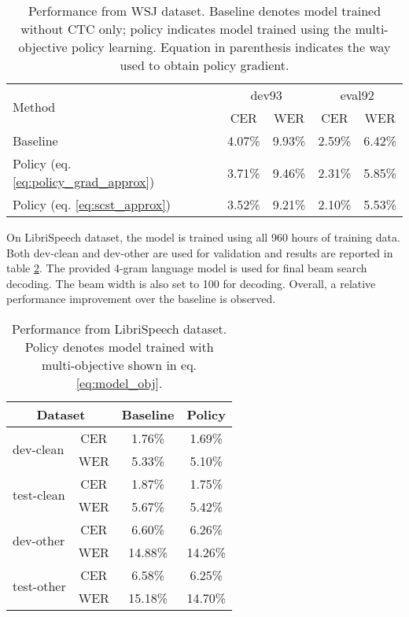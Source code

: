 \documentclass{article}
\begin{document}
\begin{table}[tbp!]
\centering
\begin{tabular}{lcccc}
\toprule
\multirow{2}{*}{Method} & \multicolumn{2}{c}{dev93} & \multicolumn{2}{c}{eval92} \\
						& CER & WER & CER & WER \\
\midrule
Baseline 								 & 4.07\% & 9.93\% & 2.59\% & 6.42\%\\
Policy (eq. \ref{eq:policy_grad_approx}) & 3.71\% & 9.46\% & 2.31\% & 5.85\%\\
Policy (eq. \ref{eq:scst_approx})  		 & 3.52\% & 9.21\% & 2.10\% & 5.53\%\\
\bottomrule
\end{tabular}
\caption{Performance from WSJ dataset. Baseline denotes model trained without CTC only; policy indicates model trained using the multi-objective policy learning. Equation in parenthesis indicates the way used to obtain policy gradient.}
\label{tbl:wsj_comp}
\end{table}


On LibriSpeech dataset, the model is trained using all 960 hours of training data. Both dev-clean and dev-other are used for validation and results are reported in table \ref{tbl:libri_comp}. The provided 4-gram language model is used for final beam search decoding. The beam width is also set to 100 for decoding. Overall, a relative  performance improvement over the baseline is observed.


\begin{table}[tbp!]
\centering
\begin{tabular}{lccc}
\toprule
\multicolumn{2}{c}{Dataset} & Baseline & Policy \\
\midrule
\multirow{2}{*}{dev-clean} 	& CER & 1.76\% 	& 1.69\%\\
							& WER & 5.33\%	& 5.10\%\\
\midrule
\multirow{2}{*}{test-clean} & CER & 1.87\% 	& 1.75\%\\
							& WER & 5.67\%	& 5.42\%\\
\midrule
\multirow{2}{*}{dev-other} 	& CER & 6.60\% 	& 6.26\%\\
							& WER & 14.88\% & 14.26\%\\
\midrule
\multirow{2}{*}{test-other} & CER & 6.58\% 	& 6.25\%\\
							& WER & 15.18\%	& 14.70\%\\
\bottomrule
\end{tabular}
\caption{Performance from LibriSpeech dataset. Policy denotes model trained with multi-objective shown in eq. \ref{eq:model_obj}.}
\label{tbl:libri_comp}
\end{table}
\end{document}
